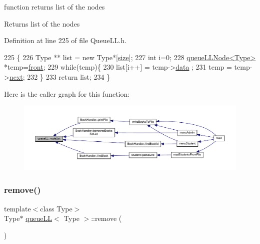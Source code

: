 function returns list of the nodes \begin{DoxyReturn}{Returns}
list of the nodes 
\end{DoxyReturn}


Definition at line 225 of file Queue\+L\+L.\+h.


\begin{DoxyCode}
225                      \{
226         Type ** list = \textcolor{keyword}{new}  Type*[\hyperlink{classqueue_l_l_af2ae538d6971624f1c8404d3a8502aa0}{size}];
227         \textcolor{keywordtype}{int} i=0;
228         \hyperlink{classqueue_l_l_node}{queueLLNode<Type>} *temp=\hyperlink{classqueue_l_l_a622ea439d113fe8e4616320ec2346d8b}{front};
229         \textcolor{keywordflow}{while}(temp)\{
230             list[i++] = temp->\hyperlink{classqueue_l_l_node_a20b1170d8c5852b7dc01e56fda4e4206}{data} ;
231             temp = temp->\hyperlink{classqueue_l_l_node_ab8367d61c51828d9f21d72537b62735f}{next};
232         \}
233         \textcolor{keywordflow}{return} list;
234     \}
\end{DoxyCode}
Here is the caller graph for this function\+:
\nopagebreak
\begin{figure}[H]
\begin{center}
\leavevmode
\includegraphics[width=350pt]{classqueue_l_l_ae9a479b9463f51c5148dd80b68335d32_icgraph}
\end{center}
\end{figure}
\mbox{\label{classqueue_l_l_a4204a9db973b69be5824ca2495130b40}} 
\subsubsection{\texorpdfstring{remove()}{remove()}}
{\footnotesize\ttfamily template$<$class Type$>$ \\
Type$\ast$ \hyperlink{classqueue_l_l}{queue\+LL}$<$ Type $>$\+::remove (\begin{DoxyParamCaption}{ }\end{DoxyParamCaption})\hspace{0.3cm}{\ttfamily [inline]}}

